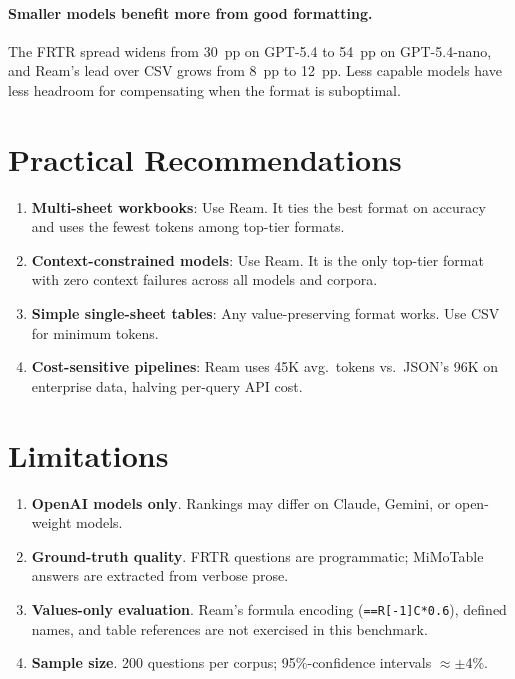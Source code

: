 \documentclass[11pt]{article}
\begin{document}
\paragraph{Smaller models benefit more from good formatting.}
The FRTR spread widens from 30~pp on GPT-5.4 to 54~pp on GPT-5.4-nano, and Ream's lead over CSV grows from 8~pp to 12~pp.
Less capable models have less headroom for compensating when the format is suboptimal.

\section{Practical Recommendations}
\label{sec:recommendations}

\begin{enumerate}[nosep]
\item \textbf{Multi-sheet workbooks}: Use Ream. It ties the best format on accuracy and uses the fewest tokens among top-tier formats.
\item \textbf{Context-constrained models}: Use Ream. It is the only top-tier format with zero context failures across all models and corpora.
\item \textbf{Simple single-sheet tables}: Any value-preserving format works. Use CSV for minimum tokens.
\item \textbf{Cost-sensitive pipelines}: Ream uses 45K avg.\ tokens vs.\ JSON's 96K on enterprise data, halving per-query API cost.
\end{enumerate}

\section{Limitations}
\label{sec:limitations}

\begin{enumerate}[nosep]
\item \textbf{OpenAI models only}. Rankings may differ on Claude, Gemini, or open-weight models.
\item \textbf{Ground-truth quality}. FRTR questions are programmatic; MiMoTable answers are extracted from verbose prose.
\item \textbf{Values-only evaluation}. Ream's formula encoding (\texttt{==R[-1]C*0.6}), defined names, and table references are not exercised in this benchmark.
\item \textbf{Sample size}. 200 questions per corpus; 95\%-confidence intervals $\approx \pm$4\%.
\end{enumerate}
\end{document}
